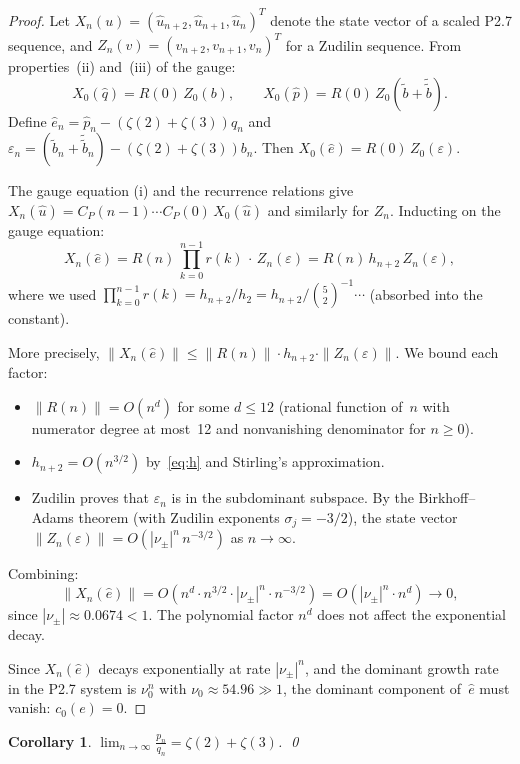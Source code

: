 \documentclass[11pt]{article}
\newtheorem{corollary}[theorem]{Corollary}
\theoremstyle{remark}
\begin{document}
\begin{proof}
Let $X_n(u) = (\hat{u}_{n+2}, \hat{u}_{n+1}, \hat{u}_n)^T$
denote the state vector of a scaled P2.7 sequence, and
$Z_n(v) = (v_{n+2}, v_{n+1}, v_n)^T$ for a Zudilin sequence.
From properties~(ii) and~(iii) of the gauge:
\[
X_0(\hat{q}) = R(0)\,Z_0(b), \qquad
X_0(\hat{p}) = R(0)\,Z_0(\tilde{b}+\tilde{\tilde{b}}).
\]
Define $\hat{e}_n = \hat{p}_n - (\zeta(2)+\zeta(3))\hat{q}_n$
and $\varepsilon_n = (\tilde{b}_n+\tilde{\tilde{b}}_n) -
(\zeta(2)+\zeta(3))b_n$. Then
$X_0(\hat{e}) = R(0)\,Z_0(\varepsilon)$.

The gauge equation (i) and the recurrence relations give
$X_n(\hat{u}) = C_P(n{-}1)\cdots C_P(0)\,X_0(\hat{u})$ and
similarly for $Z_n$. Inducting on the gauge equation:
\[
X_n(\hat{e}) = R(n)\,\prod_{k=0}^{n-1} r(k)\,\cdot\,Z_n(\varepsilon)
= R(n)\,h_{n+2}\,Z_n(\varepsilon),
\]
where we used $\prod_{k=0}^{n-1} r(k) = h_{n+2}/h_2 = h_{n+2}/\binom{5}{2}^{-1}\cdots$ (absorbed into the constant).

More precisely, $\|X_n(\hat{e})\| \le \|R(n)\|\cdot h_{n+2}\cdot\|Z_n(\varepsilon)\|$. We bound each factor:
\begin{itemize}
\item $\|R(n)\| = O(n^d)$ for some $d \le 12$
(rational function of~$n$ with numerator degree at most~12
and nonvanishing denominator for $n \ge 0$).
\item $h_{n+2} = O(n^{3/2})$ by~\eqref{eq:h} and Stirling's
approximation.
\item Zudilin \cite{Zudilin2004} proves that $\varepsilon_n$
is in the subdominant subspace. By the Birkhoff--Adams theorem
(with Zudilin exponents $\sigma_j = -3/2$), the state vector
$\|Z_n(\varepsilon)\| = O(|\nu_\pm|^n\,n^{-3/2})$
as $n \to \infty$.
\end{itemize}

Combining:
\[
\|X_n(\hat{e})\| = O(n^d \cdot n^{3/2} \cdot |\nu_\pm|^n \cdot n^{-3/2})
= O(|\nu_\pm|^n \cdot n^d) \to 0,
\]
since $|\nu_\pm| \approx 0.0674 < 1$. The polynomial factor
$n^d$ does not affect the exponential decay.

Since $X_n(\hat{e})$ decays exponentially at rate $|\nu_\pm|^n$,
and the dominant growth rate in the P2.7 system is $\nu_0^n$
with $\nu_0 \approx 54.96 \gg 1$, the dominant component
of~$\hat{e}$ must vanish: $c_0(e) = 0$.
\end{proof}

\begin{corollary}
$\displaystyle\lim_{n\to\infty} \frac{p_n}{q_n}
= \zeta(2) + \zeta(3)$. \qed
\end{corollary}
\end{document}

